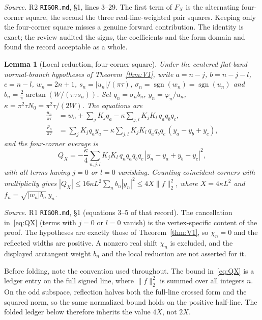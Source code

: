 \documentclass[11pt]{article}
\newtheorem{lemma}[theorem]{Lemma}
\theoremstyle{definition}
\theoremstyle{remark}
\begin{document}
\noindent\emph{Source.} R2 \texttt{RIGOR.md}, \S1, lines 3--29. The first term of $F_X$ is the alternating four-corner square, the second the three real-line-weighted pair squares. Keeping only the four-corner square misses a genuine forward contribution. The identity is exact; the review audited the signs, the coefficients and the form domain and found the record acceptable as a whole.

\begin{lemma}[Local reduction, four-corner square]\label{lem:local}
Under the centered flat-band normal-branch hypotheses of Theorem~\ref{thm:V1}, write $a=n-j$, $b=n-j-l$, $c=n-l$, $w_n=2n+1$, $s_n=|u_n|/(\pi\tau)$, $\sigma_n=\operatorname{sgn}(w_n)=\operatorname{sgn}(u_n)$ and $b_n=\tfrac2\pi\arctan(W/(\pi\tau s_n))$. Set $q_n=\sigma_n b_n$, $y_n=\varphi_n/u_n$, $\kappa=\pi^2\tau N_0=\pi^2\tau/(2W)$. The equations are
\begin{align}
\frac{u_n}{\pi\tau}&=w_n+\sum_jK_jq_a-\kappa\sum_{j,l}K_jK_l\,q_aq_bq_c,\nonumber\\
\frac{\varphi_n}{\pi\tau}&=\sum_jK_jq_ay_a-\kappa\sum_{j,l}K_jK_l\,q_aq_bq_c\,(y_a-y_b+y_c),\label{eq:localeq}
\end{align}
and the four-corner average is
\begin{equation}\label{eq:QX}
Q_X=-\frac\kappa4\sum_{n,j,l}K_jK_l\,q_nq_aq_bq_c\,|y_n-y_a+y_b-y_c|^2,
\end{equation}
with all terms having $j=0$ or $l=0$ vanishing. Counting coincident corners with multiplicity gives $|Q_X|\le16\kappa L^2\sum_n b_n|y_n|^2\le4X\|f\|_2^2$, where $X=4\kappa L^2$ and $f_n=\sqrt{|w_n|b_n}\,y_n$.
\end{lemma}

\noindent\emph{Source.} R1 \texttt{RIGOR.md}, \S1 (equations 3--5 of that record). The cancellation in~\eqref{eq:QX} (terms with $j=0$ or $l=0$ vanish) is the vertex-specific content of the proof. The hypotheses are exactly those of Theorem~\ref{thm:V1}, so $\chi_n=0$ and the reflected widths are positive. A nonzero real shift $\chi_n$ is excluded, and the displayed arctangent weight $b_n$ and the local reduction are not asserted for it.

Before folding, note the convention used throughout. The bound in~\eqref{eq:QX} is a ledger entry on the full signed line, where $\|f\|_2^2$ is summed over all integers $n$. On the odd subspace, reflection halves both the full-line crossed form and the squared norm, so the same normalized bound holds on the positive half-line. The folded ledger below therefore inherits the value $4X$, not $2X$.
\end{document}
